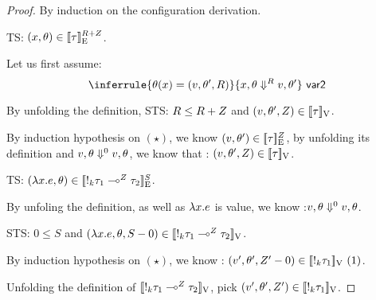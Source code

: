 \begin{proof}
  By induction on the configuration derivation.\\
   

  TS: $(x, \env) \in  \lre{}{\adapt + \nnatA}{ \type}$.
  
  Let us first assume: \[   \inferrule{  \env(x)  =  (\valr, \env',  \adapt)  }{x,
      \env  \bigstep{\adapt} \valr, \env' }~\textsf{var2}  \]
  
  By unfolding the definition, STS: $\adapt \leq \adapt + \nnatA $  and $ (\valr, \env', \nnatA  ) \in \lrv{\type} $.

  By induction hypothesis on $(\star)$, we know $ (\valr, \env') \in
  \lre{}{\nnatA}{\type} $, by unfolding its definition and $ \valr,
  \env \bigstep{0} \valr, \env $,  we know that : $ (\valr, \env' ,
  \nnatA ) \in \lrv{\type}$.



   TS: $(\lambda x. \expr , \env) \in  \lre{}{S}{  \bang{\idx} \type_1\lto{\nnatA} \type_2 }$.
  
  By unfoling the definition, as well as $\lambda x. \expr$ is value, we know :$ \valr, \env \bigstep{0} \valr, \env$.
  
  STS: $0 \leq S $  and $ (\lambda x.\expr, \env, S-0  ) \in \lrv{ \bang{\idx} \type_1\lto{\nnatA} \type_2 } $.

  By induction hypothesis on $(\star)$,  we know : $ (\valr', \env'
  ,\nnatA' -0) \in \lrv{\bang{k} \type_1} ~(1) $.

  Unfolding the definition of $\lrv{ \bang{\idx} \type_1\lto{\nnatA}
    \type_2 }$,  pick $ (\valr', \env' ,\nnatA') \in \lrv{\bang{k}
    \type_1} $.  


\end{proof}
